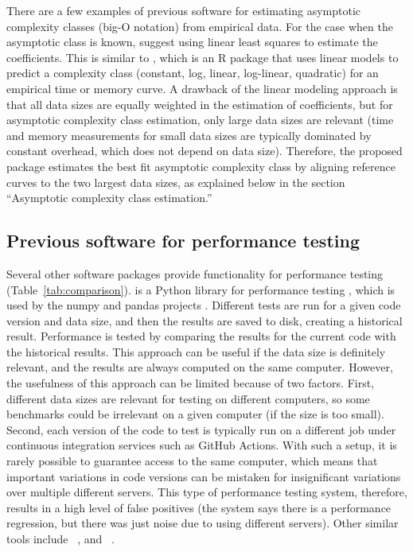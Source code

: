 There are a few examples of previous software for estimating asymptotic complexity classes (big-O notation) from empirical data.
For the case when the asymptotic class is known, \citet{scutari2023pragmatic} suggest using linear least squares to estimate the coefficients.
This is similar to  \citep{testComplexity}, which is an R package that uses linear models to predict a complexity class (constant, log, linear, log-linear, quadratic) for an empirical time or memory curve.
A drawback of the linear modeling approach is that all data sizes are equally weighted in the estimation of coefficients, but for asymptotic complexity class estimation, only large data sizes are relevant (time and memory measurements for small data sizes are typically dominated by constant overhead, which does not depend on data size).
Therefore, the proposed  package estimates the best fit asymptotic complexity class by aligning reference curves to the two largest data sizes, as explained below in the section ``Asymptotic complexity class estimation.''

\subsection{Previous software for performance testing}

Several other software packages provide functionality for performance testing (Table~\ref{tab:comparison}).
 is a Python library for performance testing \citep{airspeed_velocity}, which is used by the numpy and pandas projects \citep{numpy,pandas}. 
Different tests are run for a given code version and data size, and then the results are saved to disk, creating a historical result.
Performance is tested by comparing the results for the current code with the historical results.
This approach can be useful if the data size is definitely relevant, and the results are always computed on the same computer.
However, the usefulness of this approach can be limited because of two factors. 
First, different data sizes are relevant for testing on different computers, so some benchmarks could be irrelevant on a given computer (if the size is too small). 
Second, each version of the code to test is typically run on a different job under continuous integration services such as GitHub Actions. 
With such a setup, it is rarely possible to guarantee access to the same computer, which means that important variations in code versions can be mistaken for insignificant variations over multiple different servers.
This type of performance testing system, therefore, results in a high level of false positives (the system says there is a performance regression, but there was just noise due to using different servers).
Other similar tools include
~\citep{conbench}, 
and ~\citep{bencher}.

